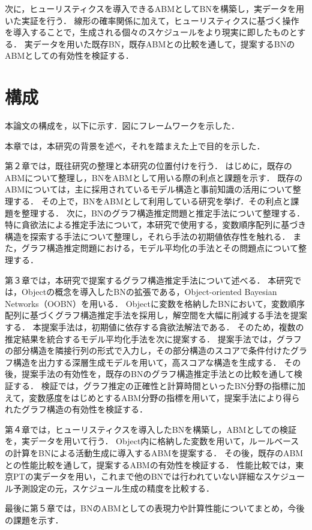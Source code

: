 次に，ヒューリスティクスを導入できるABMとしてBNを構築し，実データを用いた実証を行う．
線形の確率関係に加えて，ヒューリスティクスに基づく操作を導入することで，生成される個々のスケジュールをより現実に即したものとする．
実データを用いた既存BN，既存ABMとの比較を通して，提案するBNのABMとしての有効性を検証する．

\section{構成}\label{1.3}
本論文の構成を，以下に示す．図にフレームワークを示した．

本章では，本研究の背景を述べ，それを踏まえた上で目的を示した．

第２章では，既往研究の整理と本研究の位置付けを行う．
はじめに，既存のABMについて整理し，BNをABMとして用いる際の利点と課題を示す．
既存のABMについては，主に採用されているモデル構造と事前知識の活用について整理する．
その上で，BNをABMとして利用している研究を挙げ．その利点と課題を整理する．
次に，BNのグラフ構造推定問題と推定手法について整理する．
特に貪欲法による推定手法について，本研究で使用する，変数順序配列に基づき構造を探索する手法について整理し，それら手法の初期値依存性を触れる．
また，グラフ構造推定問題における，モデル平均化の手法とその問題点について整理する．

第３章では，本研究で提案するグラフ構造推定手法について述べる．
本研究では，Objectの概念を導入したBNの拡張である，Object-oriented Bayesian Networks（OOBN）\cite{Baydin2018}を用いる．
Objectに変数を格納したBNにおいて，変数順序配列に基づくグラフ構造推定手法\cite{Baydin2018}を採用し，解空間を大幅に削減する手法を提案する．
本提案手法は，初期値に依存する貪欲法解法である．
そのため，複数の推定結果を統合するモデル平均化手法を次に提案する．
提案手法では，グラフの部分構造を隣接行列の形式で入力し，その部分構造のスコアで条件付けたグラフ構造を出力する深層生成モデル\cite{Baydin2018}を用いて，高スコアな構造を生成する．
その後，提案手法の有効性を，既存のBNのグラフ構造推定手法との比較を通して検証する．
検証では，グラフ推定の正確性と計算時間といったBN分野の指標に加えて，変数感度をはじめとするABM分野の指標を用いて，提案手法により得られたグラフ構造の有効性を検証する．

第４章では，ヒューリスティクスを導入したBNを構築し，ABMとしての検証を，実データを用いて行う．
Object内に格納した変数を用いて，ルールベースの計算をBNによる活動生成に導入するABMを提案する．
その後，既存のABMとの性能比較を通して，提案するABMの有効性を検証する．
性能比較では，東京PTの実データを用い，これまで他のBNでは行われていない詳細なスケジュール予測設定の元，スケジュール生成の精度を比較する．

最後に第５章では，BNのABMとしての表現力や計算性能についてまとめ，今後の課題を示す．